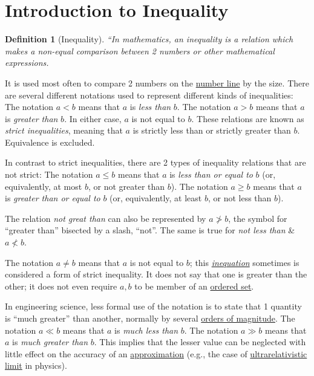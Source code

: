 \documentclass{article}
\newtheorem{definition}{Definition}
\begin{document}
\section{Introduction to Inequality}

\begin{definition}[Inequality]
	``In mathematics, an \emph{inequality} is a relation which makes a non-equal comparison between 2 numbers or other mathematical expressions.
\end{definition}
It is used most often to compare 2 numbers on the \href{https://en.wikipedia.org/wiki/Number_line}{number line} by the size. There are several different notations used to represent different kinds of inequalities: The notation $a < b$ means that $a$ is \textit{less than} $b$. The notation $a > b$ means that $a$ is \textit{greater than} $b$. In either case, $a$ is not equal to $b$. These relations are known as \textit{strict inequalities}, meaning that $a$ is strictly less than or strictly greater than $b$. Equivalence is excluded.

In contrast to strict inequalities, there are 2 types of inequality relations that are not strict: The notation $a\le b$ means that $a$ is \textit{less than or equal to} $b$ (or, equivalently, at most $b$, or not greater than $b$). The notation $a\ge b$ means that $a$ is \textit{greater than or equal to} $b$ (or, equivalently, at least $b$, or not less than $b$).

The relation \textit{not great than} can also be represented by $a\not > b$, the symbol for ``greater than'' bisected by a slash, ``not''. The same is true for \textit{not less than} \& $a\not < b$.

The notation $a\ne b$ means that $a$ is not equal to $b$; this \href{https://en.wikipedia.org/wiki/Inequation}{\textit{inequation}} sometimes is considered a form of strict inequality. It does not say that one is greater than the other; it does not even require $a,b$  to be member of an \href{https://en.wikipedia.org/wiki/Ordered_set}{ordered set}.

In engineering science, less formal use of the notation is to state that 1 quantity is ``much greater'' than another, normally by several \href{https://en.wikipedia.org/wiki/Order_of_magnitude}{orders of magnitude}. The notation $a\ll b$ means that $a$ is \textit{much less than} $b$. The notation $a\gg b$ means that $a$ is \textit{much greater than} $b$. This implies that the lesser value can be neglected with little effect on the accuracy of an \href{https://en.wikipedia.org/wiki/Approximation}{approximation} (e.g., the case of \href{https://en.wikipedia.org/wiki/Ultrarelativistic_limit}{ultrarelativistic limit} in physics).
\end{document}
